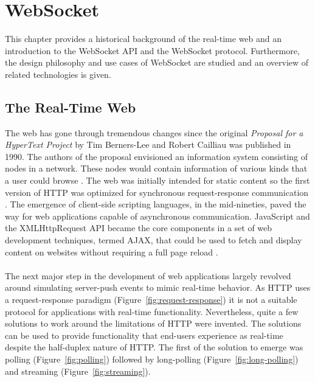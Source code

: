\chapter{WebSocket}
\label{chapter:websocket}

This chapter provides a historical background of the real-time web and an introduction to the WebSocket API and the WebSocket protocol. Furthermore, the design philosophy and use cases of WebSocket are studied and an overview of related technologies is given.

\section{The Real-Time Web}

The web has gone through tremendous changes since the original \textit{Proposal for a HyperText Project} by Tim Berners-Lee and Robert Cailliau was published in 1990. The authors of the proposal envisioned an information system consisting of nodes in a network. These nodes would contain information of various kinds that a user could browse \cite{berners1990worldwideweb}. The web was initially intended for static content so the first version of HTTP was optimized for synchronous request-response communication \cite{berners1991original}. The emergence of client-side scripting languages, in the mid-nineties, paved the way for web applications capable of asynchronous communication. JavaScript and the XMLHttpRequest API became the core components in a set of web development techniques, termed AJAX, that could be used to fetch and display content on websites without requiring a full page reload \cite{garrett2005ajax}.
\\ \\
The next major step in the development of web applications largely revolved around simulating server-push events to mimic real-time behavior. As HTTP uses a request-response paradigm (Figure~\ref{fig:request-response}) it is not a suitable protocol for applications with real-time functionality. Nevertheless, quite a few solutions to work around the limitations of HTTP were invented. The solutions can be used to provide functionality that end-users experience as real-time despite the half-duplex nature of HTTP. The first of the solution to emerge was polling (Figure~\ref{fig:polling}) followed by long-polling (Figure~\ref{fig:long-polling}) and streaming (Figure~\ref{fig:streaming}).
\\
